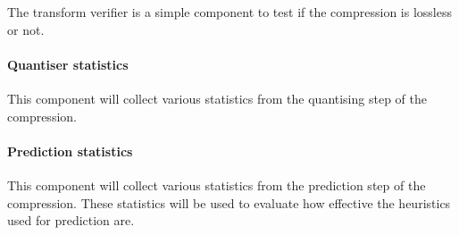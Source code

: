 The transform verifier is a simple component to test if the compression is
lossless or not.


\paragraph{Quantiser statistics}

This component will collect various statistics from the quantising step of the
compression.


\paragraph{Prediction statistics}

This component will collect various statistics from the prediction step of the
compression. These statistics will be used to evaluate how effective the
heuristics used for prediction are.




